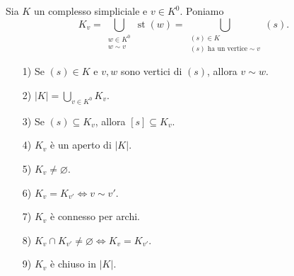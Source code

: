 \begin{definicion}
Sia $K$ un complesso simpliciale e $v \in K^0$. Poniamo
\[
K_v = \bigcup_{\substack{w \in K^0 \\ w \sim v}} \operatorname{st}(w) = \bigcup_{\substack{(s) \in K \\ (s) \text{ ha un vertice} \sim v}} (s).
\]
\end{definicion}

\begin{prop}[Propriet\`a di $K_v$]
\begin{enumerate}
    \item[1)] Se $(s) \in K$ e $v, w$ sono vertici di $(s)$, allora $v \sim w$.
    \item[2)] $|K| = \bigcup_{v \in K^0} K_v$.
    \item[3)] Se $(s) \subseteq K_v$, allora $[s] \subseteq K_v$.
    \item[4)] $K_v$ \`e un aperto di $|K|$.
    \item[5)] $K_v \neq \varnothing$.
    \item[6)] $K_v = K_{v'} \iff v \sim v'$.
    \item[7)] $K_v$ \`e connesso per archi.
    \item[8)] $K_v \cap K_{v'} \neq \varnothing \iff K_v = K_{v'}$.
    \item[9)] $K_v$ \`e chiuso in $|K|$.
\end{enumerate}
\end{prop}


